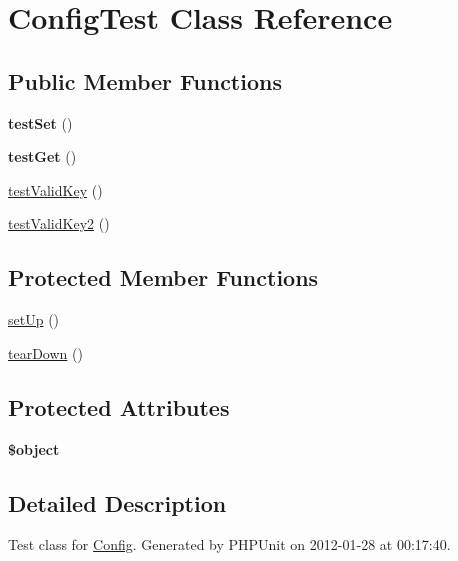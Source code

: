 \hypertarget{class_config_test}{\section{\-Config\-Test \-Class \-Reference}
\label{class_config_test}
}
\subsection*{\-Public \-Member \-Functions}
\begin{DoxyCompactItemize}
\item 
\hypertarget{class_config_test_a7990f383174edbd4b04ea9298e6be80b}{{\bfseries test\-Set} ()}\label{class_config_test_a7990f383174edbd4b04ea9298e6be80b}

\item 
\hypertarget{class_config_test_ac2d7c7125d2d3749e9ede4aa2ba6ba3b}{{\bfseries test\-Get} ()}\label{class_config_test_ac2d7c7125d2d3749e9ede4aa2ba6ba3b}

\item 
\hyperlink{class_config_test_a879660461398c563b01b7998eb6b6eab}{test\-Valid\-Key} ()
\item 
\hyperlink{class_config_test_a7e84b7657d82177e72d8a0c5bdf23d12}{test\-Valid\-Key2} ()
\end{DoxyCompactItemize}
\subsection*{\-Protected \-Member \-Functions}
\begin{DoxyCompactItemize}
\item 
\hyperlink{class_config_test_a0bc688732d2b3b162ffebaf7812e78da}{set\-Up} ()
\item 
\hyperlink{class_config_test_a80fe3d17e658907fc75346a0ec9d6fc7}{tear\-Down} ()
\end{DoxyCompactItemize}
\subsection*{\-Protected \-Attributes}
\begin{DoxyCompactItemize}
\item 
\hypertarget{class_config_test_a52123b83a1952a68c5513e47d59ec4a6}{{\bfseries \$object}}\label{class_config_test_a52123b83a1952a68c5513e47d59ec4a6}

\end{DoxyCompactItemize}


\subsection{\-Detailed \-Description}
\-Test class for \hyperlink{class_config}{\-Config}. \-Generated by \-P\-H\-P\-Unit on 2012-\/01-\/28 at 00\-:17\-:40. 

